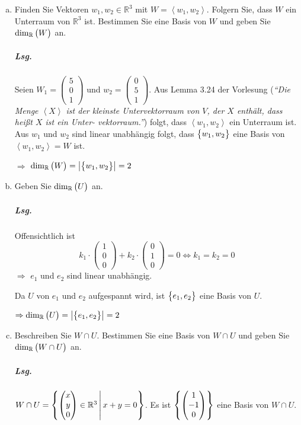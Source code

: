 \documentclass{scrreprt}
\newcommand\hull[1]{\left\langle #1 \right\rangle}
\begin{document}
\begin{enumerate}[(a)]
\item Finden Sie Vektoren $w_1, w_2 \in \mathbb{R}^3$ mit $W = \hull{w_1, w_2}$.
  Folgern Sie, dass $W$ ein Unterraum von $\mathbb{R}^3$ ist.
  Bestimmen Sie eine Basis von $W$ und geben Sie $\dim_{\mathbb{R}}\qty\big(W)$ an.

  \subparagraph{Lsg.} Seien $W_1 = \begin{pmatrix} 5 \\ 0 \\ 1 \end{pmatrix}$
  und $w_2 = \begin{pmatrix} 0 \\ 5 \\ 1 \end{pmatrix}$.
  Aus Lemma 3.24 der Vorlesung (\emph{``Die Menge $\hull{X}$ ist der kleinste
    Untervektorraum von $V$, der $X$ enthält, dass heißt $X$ ist ein Unter-
    vektorraum.''}) folgt, dass $\hull{w_1, w_2}$ ein Unterraum ist.
  Aus $w_1$ und $w_2$ sind linear unabhängig folgt, dass $\qty\big{w_1, w_2}$
  eine Basis von $\hull{w_1, w_2} = W$ ist.

  $\Rightarrow$ $\dim_{\mathbb{R}}\qty\big(W) = \abs{\qty\big{w_1, w_2}} = 2$

\item Geben Sie $\dim_{\mathbb{R}}\qty\big(U)$ an.

  \subparagraph{Lsg.} Offensichtlich ist
  \[
    k_1 \cdot \begin{pmatrix} 1 \\ 0 \\ 0 \end{pmatrix} +
    k_2 \cdot \begin{pmatrix} 0 \\ 1 \\ 0 \end{pmatrix} = 0
    \iff k_1  = k_2 = 0
  \]
  $\Rightarrow$ $e_1$ und $e_2$ sind linear unabhängig.

  Da $U$ von $e_1$ und $e_2$ aufgespannt wird, ist $\qty\big{e_1, e_2}$ eine
  Basis von $U$.

  $\Rightarrow \dim_{\mathbb{R}}\qty\big(U) = \abs{\qty\big{e_1, e_2}} = 2$

\item Beschreiben Sie $W \cap U$.
  Bestimmen Sie eine Basis von $W \cap U$ und geben Sie
  $\dim_{\mathbb{R}}\qty\big(W \cap U)$ an.

  \subparagraph{Lsg.} $W \cap U = \qty{\begin{pmatrix} x \\ y \\ 0 \end{pmatrix}
    \in \mathbb{R}^3 \, \middle | \, x + y = 0}$.
  Es ist $\qty{\begin{pmatrix} 1 \\ -1 \\ 0 \end{pmatrix}}$ eine Basis von
  $W \cap U$.


\end{enumerate}
\end{document}
